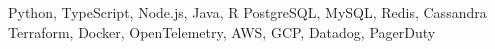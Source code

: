 
\vspace{0.3cm}

\begin{cvskills}
   {Python, TypeScript, Node.js, Java, R}
   {PostgreSQL, MySQL, Redis, Cassandra}
   {Terraform, Docker, OpenTelemetry, AWS, GCP, Datadog, PagerDuty}
\end{cvskills}

